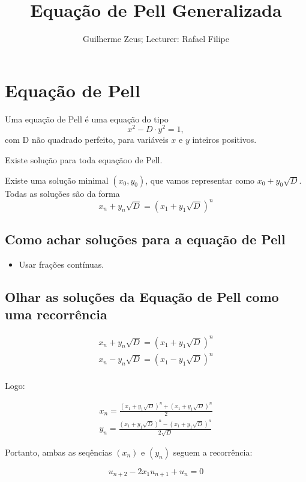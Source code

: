 \documentclass[10pt,a4paper]{article}
\title{Equação de Pell Generalizada}
\author{Guilherme Zeus; Lecturer: Rafael Filipe}
\newcommand\sD{\sqrt{D}}
\begin{document}
	\zeustitle

	\section{Equação de Pell}

	Uma equação de Pell é uma equação do tipo $$x^2 - D \cdot y^2 = 1,$$ com D não quadrado perfeito, para variáveis $x$ e $y$ inteiros positivos.

	\begin{thm}
		Existe solução para toda equaçãoo de Pell.
	\end{thm}

	\begin{thm}
		Existe uma solução minimal $(x_0, y_0)$, que vamos representar como $x_0 + y_0 \sqrt{D}$.
		Todas as soluções são da forma $$x_n + y_n \sqrt{D} = (x_1 + y_1 \sqrt{D})^n$$
	\end{thm}
	
	\subsection{Como achar soluções para a equação de Pell}

	\begin{itemize}
		\item Usar frações contínuas.
	\end{itemize}

	\subsection{Olhar as soluções da Equação de Pell como uma recorrência}

	\begin{gather*}
	x_n + y_n \sD = (x_1 + y_1 \sD)^n \\ 
	x_n - y_n \sD = (x_1 - y_1 \sD)^n \\
	\end{gather*}

	Logo:

	\begin{gather*}
		x_n = \frac{(x_1 + y_1 \sD)^n + (x_1 + y_1 \sD)^n}{2} \\
		y_n = \frac{(x_1 + y_1 \sD)^n - (x_1 + y_1 \sD)^n}{2\sD}
	\end{gather*}

	Portanto, ambas as seqências $(x_n)$ e $(y_n)$ seguem a recorrência:

	\begin{equation*}
		u_{n+2} - 2x_1 u_{n+1} + u_n = 0
	\end{equation*}
\end{document}
